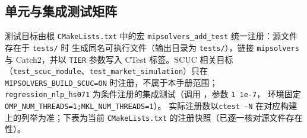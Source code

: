 \subsection{单元与集成测试矩阵}
\label{sec:engine-nv-testmatrix}

测试目标由根 \texttt{CMakeLists.txt} 中的宏
\texttt{mipsolvers\_add\_test} 统一注册：源文件存在于 \texttt{tests/} 时
生成同名可执行文件（输出目录为 \texttt{tests/}），链接 \texttt{mipsolvers}
与 Catch2，并以 \texttt{TIER} 参数写入 CTest 标签。SCUC 相关目标
（\texttt{test\_scuc\_module}、\texttt{test\_market\_simulation}）只在
\texttt{MIPSOLVERS\_BUILD\_SCUC=ON} 时注册，不属于本手册范围；
\texttt{regression\_nlp\_hs071} 为条件注册的集成测试（调用
，参数 \texttt{1 1e-7}，
环境固定 \texttt{OMP\_NUM\_THREADS=1;MKL\_NUM\_THREADS=1}）。
实际注册数以\texttt{ctest -N} 在对应构建上的列举为准；下表为当前
\texttt{CMakeLists.txt} 的注册快照（已逐一核对源文件存在性）。


